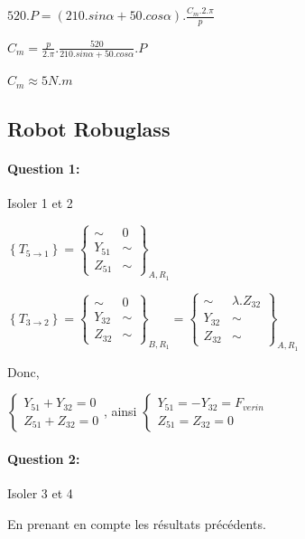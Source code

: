 $520.P=(210.sin\alpha+50.cos\alpha).\frac{C_m.2.\pi}{p}$

$C_m=\frac{p}{2.\pi}.\frac{520}{210.sin\alpha+50.cos\alpha}.P$

$C_m\approx 5N.m$

\subsection{Robot Robuglass}

\paragraph{Question 1:}

Isoler 1 et 2

$\left\{T_{5\rightarrow 1}\right\}=\left\{
\begin{array}{cc}
\sim & 0 \\
Y_{51} & \sim \\
Z_{51} & \sim
\end{array}
\right\}_{A,R_1}$

$\left\{T_{3\rightarrow 2}\right\}=\left\{
\begin{array}{cc}
\sim & 0 \\
Y_{32} & \sim \\
Z_{32} & \sim
\end{array}
\right\}_{B,R_1}=\left\{
\begin{array}{cc}
\sim & \lambda.Z_{32} \\
Y_{32} & \sim \\
Z_{32} & \sim
\end{array}
\right\}_{A,R_1}$

Donc,

$\left\{\begin{array}{l}
Y_{51}+Y_{32}=0 \\
Z_{51}+Z_{32}=0
\end{array}\right.$, ainsi $\left\{\begin{array}{l}
Y_{51}=-Y_{32}=F_{verin} \\
Z_{51}=Z_{32}=0
\end{array}\right.$

\paragraph{Question 2:}

Isoler 3 et 4

En prenant en compte les résultats précédents.

